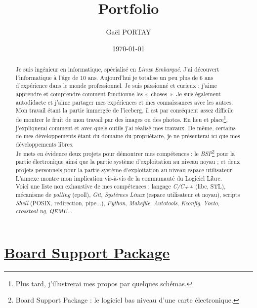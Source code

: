 \documentclass[a4paper]{article}
\title{Portfolio}
\author{Gaël PORTAY}
\date{\today}
\begin{document}
\sloppy
\maketitle

\begin{abstract}
Je suis ingénieur en informatique, spécialisé en \textit{Linux Embarqué}. J'ai découvert l'informatique à l'âge de 10 ans. Aujourd'hui je totalise un peu plus de 6 ans d’expérience dans le monde professionnel. Je suis passionné et curieux : j'aime apprendre et comprendre comment fonctionne les «~choses~». Je suis également autodidacte et j'aime partager mes expériences et mes connaissances avec les autres.\\

Mon travail étant la partie immergée de l'iceberg, il est par conséquent assez difficile de montrer le fruit de mon travail par des images ou des photos. En lieu et place\footnote{Plus tard, j'illustrerai mes propos par quelques schémas.}, j'expliquerai comment et avec quels outils j'ai réalisé mes travaux. De même, certains de mes développements étant du domaine du propriétaire, je ne présenterai ici que mes développements libres.\\

Je mets en évidence deux projets pour démontrer mes compétences : le \textit{BSP}\footnote{Board Support Package : le logiciel bas niveau d'une carte électronique.} pour la partie électronique ainsi que la partie système d'exploitation au niveau noyau ; et deux projets personnels pour la partie système d'exploitation au niveau espace utilisateur. L'annexe montre mon implication vis-à-vis de la communauté du Logiciel Libre.\\

Voici une liste non exhaustive de mes compétences : langage \textit{C/C++} (libc, STL), mécanisme de \textit{polling} (epoll), \textit{Git}, \textit{Systèmes Linux} (espace utilisateur et noyau), scripts \textit{Shell} (POSIX, redirection, pipe...), \textit{Python}, \textit{Makefile}, \textit{Autotools}, \textit{Kconfig}, \textit{Yocto}, \textit{crosstool-ng}, \textit{QEMU}...
\end{abstract}
\clearpage

\tableofcontents
\clearpage

\part{\href{https://fr.wikipedia.org/wiki/Board_support_package}{Board Support Package}}
\end{document}
